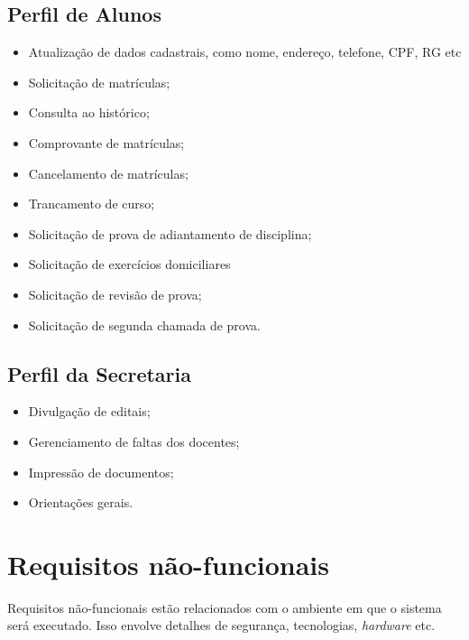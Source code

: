 \documentclass{book}
\begin{document}
\subsection{Perfil de Alunos}

\begin{itemize}
	\item Atualização de dados cadastrais, como nome, endereço, telefone, CPF, RG etc
	\item Solicitação de matrículas;
	\item Consulta ao histórico;
	\item Comprovante de matrículas;
	\item Cancelamento de matrículas;
	\item Trancamento de curso;
	\item Solicitação de prova de adiantamento de disciplina;
	\item Solicitação de exercícios domiciliares%
	\item Solicitação de revisão de prova;
	\item Solicitação de segunda chamada de prova.
\end{itemize}




\subsection{Perfil da Secretaria}

\begin{itemize}
	\item Divulgação de editais;
	\item Gerenciamento de faltas dos docentes;
	\item Impressão de documentos;
	\item Orientações gerais.
\end{itemize}








\section{Requisitos não-funcionais}

Requisitos não-funcionais estão relacionados com o ambiente em que o sistema será executado. Isso
envolve detalhes de segurança, tecnologias, \textit{hardware} etc.\\
\end{document}
